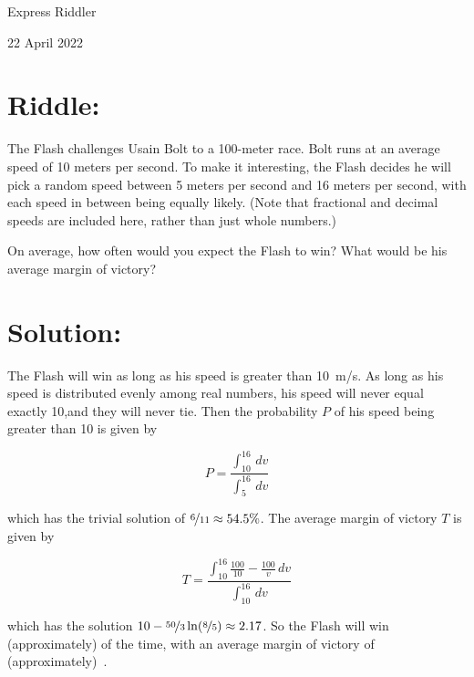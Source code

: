 \documentclass{article}
\begin{document}
\pagestyle{empty} %

\begin{center}
{\LARGE Express Riddler}

\vspace{0.15in}

{\Large 22 April 2022}
\end{center}


\section*{Riddle:}

The Flash challenges Usain Bolt to a 100-meter race.
Bolt runs at an average speed of 10 meters per second.
To make it interesting, the Flash decides he will pick a random speed between 5 meters per second and 16 meters per second, with each speed in between being equally likely.
(Note that fractional and decimal speeds are included here, rather than just whole numbers.)

On average, how often would you expect the Flash to win?
What would be his average margin of victory?


\section*{Solution:}

The Flash will win as long as his speed is greater than 10~m/s.
As long as his speed is distributed evenly among real numbers, his speed will never equal exactly 10,and they will never tie.
Then the probability $P$ of his speed being greater than 10 is given by

\[
P=\frac{ \int_{10}^{16}\,dv }{ \int_{5}^{16}\,dv }
\]

which has the trivial solution of $\nicefrac{6}{11}\approx54.5\%$.
The average margin of victory $T$ is given by

\[
T=\frac{ \int_{10}^{16}\frac{100}{10}-\frac{100}{v}\,dv }{ \int_{10}^{16}\,dv }
\]

which has the solution $10-\nicefrac{50}{3}\ln(\nicefrac{8}{5})\approx2.17$.
So the Flash will win (approximately)  of the time, with an average margin of victory of (approximately) \,.
\end{document}
